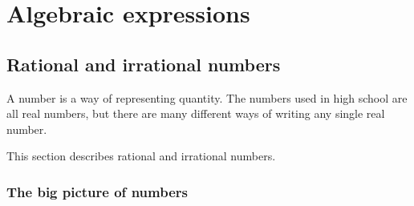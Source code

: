 \chapter{Algebraic expressions}
\section{Rational and irrational numbers}
\setcounter{figure}{1}
\setcounter{subfigure}{1}

A number is a way of representing quantity. The numbers used in high school are all real numbers, but there are many different ways of writing any single real number.\par 
This section describes rational and irrational numbers.\par 
{}

\par 
\subsection*{The big picture of numbers}


